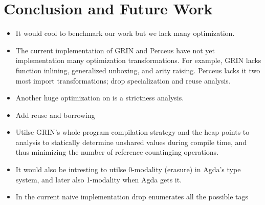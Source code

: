 \documentclass{article}
\begin{document}
\section{Conclusion and Future Work}
\begin{itemize}
\item It would cool to benchmark our work but we lack many optimization.
\item The current implementation of GRIN and Perceus have not yet implementation many optimization transformations. For example, GRIN lacks function inlining, generalized unboxing, and arity raising. Perceus lacks it two most import transformations; drop specialization and reuse analysis.
\item Another huge optimization on is a strictness analysis. 
\item Add reuse and borrowing
\item Utilse GRIN's whole program compilation strategy and the heap points-to analysis to statically determine unshared values during compile time, and thus minimizing the number of reference countinging operations.
\item It would also be intresting to utilse 0-modality (erasure) in Agda's type system, and later also 1-modality when Agda gets it.
\item In the current naive implementation drop enumerates all the possible tags 
\end{itemize}


\printbibliography
\end{document}
